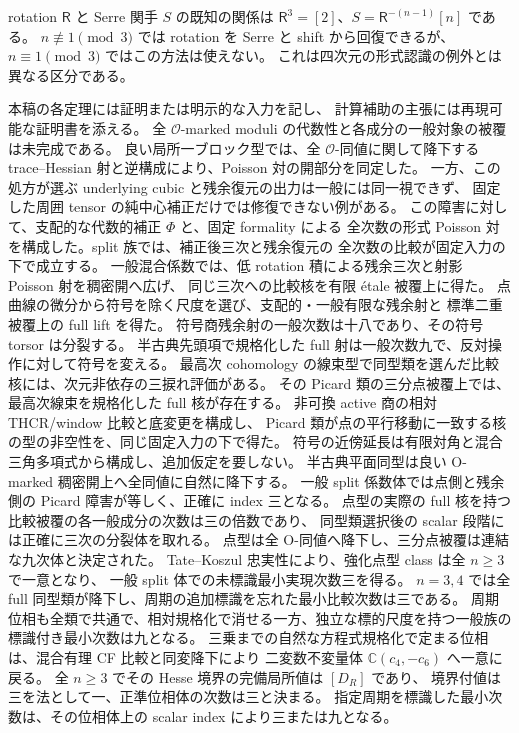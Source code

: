 \documentclass[11pt,a4paper]{ltjsarticle}
\numberwithin{equation}{section}
\newcommand{\C}{\mathbb C}
\begin{document}
rotation $\mathsf R$ と Serre 関手 $S$ の既知の関係は
$\mathsf R^3=[2]$、$S=\mathsf R^{-(n-1)}[n]$ である。
$n\not\equiv1\pmod3$ では rotation を Serre と shift から回復できるが、
$n\equiv1\pmod3$ ではこの方法は使えない。
これは四次元の形式認識の例外とは異なる区分である。

本稿の各定理には証明または明示的な入力を記し、
計算補助の主張には再現可能な証明書を添える。
全 $\mathcal O$-marked moduli の代数性と各成分の一般対象の被覆は未完成である。
良い局所一ブロック型では、全 $\mathcal O$-同値に関して降下する
trace--Hessian 射と逆構成により、Poisson 対の開部分を同定した。
一方、この処方が選ぶ underlying cubic と残余復元の出力は一般には同一視できず、
固定した周囲 tensor の純中心補正だけでは修復できない例がある。
この障害に対して、支配的な代数的補正 $\Phi$ と、固定 formality による
全次数の形式 Poisson 対を構成した。split 族では、補正後三次と残余復元の
全次数の比較が固定入力の下で成立する。
一般混合係数では、低 rotation 積による残余三次と射影 Poisson 射を稠密開へ広げ、
同じ三次への比較核を有限 étale 被覆上に得た。
点曲線の微分から符号を除く尺度を選び、支配的・一般有限な残余射と
標準二重被覆上の full lift を得た。
符号商残余射の一般次数は十八であり、その符号 torsor は分裂する。
半古典先頭項で規格化した full 射は一般次数九で、反対操作に対して符号を変える。
最高次 cohomology の線束型で同型類を選んだ比較核には、次元非依存の三捩れ評価がある。
その Picard 類の三分点被覆上では、最高次線束を規格化した full 核が存在する。
非可換 active 商の相対 THCR/window 比較と底変更を構成し、
Picard 類が点の平行移動に一致する核の型の非空性を、同じ固定入力の下で得た。
符号の近傍延長は有限対角と混合三角多項式から構成し、追加仮定を要しない。
半古典平面同型は良い O-marked 稠密開上へ全同値に自然に降下する。
一般 split 係数体では点側と残余側の Picard 障害が等しく、正確に index 三となる。
点型の実際の full 核を持つ比較被覆の各一般成分の次数は三の倍数であり、
同型類選択後の scalar 段階には正確に三次の分裂体を取れる。
点型は全 O-同値へ降下し、三分点被覆は連結な九次体と決定された。
Tate--Koszul 忠実性により、強化点型 class は全 $n\ge3$ で一意となり、
一般 split 体での未標識最小実現次数三を得る。
$n=3,4$ では全 full 同型類が降下し、周期の追加標識を忘れた最小比較次数は三である。
周期位相も全類で共通で、相対規格化で消せる一方、独立な標的尺度を持つ一般族の
標識付き最小次数は九となる。
三乗までの自然な方程式規格化で定まる位相は、混合有理 CF 比較と同変降下により
二変数不変量体 $\C(c_4,-c_6)$ へ一意に戻る。
全 $n\ge3$ でその Hesse 境界の完備局所値は $[D_R]$ であり、
境界付値は三を法として一、正準位相体の次数は三と決まる。
指定周期を標識した最小次数は、その位相体上の scalar index により三または九となる。
\end{document}
